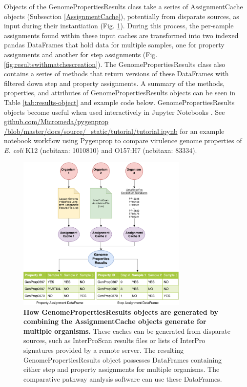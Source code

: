 Objects of the GenomePropertiesResults class take a series of AssignmentCache 
objects (Subsection \ref{AssignmentCache}), potentially from disparate sources, 
as input during their instantiation (Fig. \ref{fig:resultscreation}). During 
this process, the per-sample assignments found within these input caches are 
transformed into two indexed pandas DataFrames \cite{mckinney2010data} that hold 
data for multiple samples, one for property assignments and another for step 
assignments (Fig. \ref{fig:resultswithmatchescreation}). The 
GenomePropertiesResults class also contains a series of methods that return 
versions of these DataFrames with filtered down step and property assignments. A 
summary of the methods, properties, and attributes of GenomePropertiesResults 
objects can be seen in Table \ref{tab:results-object} and example code below. 
GenomePropertiesResults objects become useful when used interactively in Jupyter 
Notebooks \cite{kluyver2016jupyter}. See 
\href{http://github.com/Micromeda/pygenprop/blob/master/docs/source/_static/tutorial/tutorial.ipynb}{github.com/Micromeda/pygenprop 
/blob/master/docs/source/\_static/tutorial/tutorial.ipynb} for an example 
notebook workflow using Pygenprop to compare virulence genome properties of 
\textit{E. coli} K12 (\gls{ncbitaxa}: 1010810) and O157:H7 (\gls{ncbitaxa}: 
83334).

\begin{figure}[!ht]
  \centering
	\includegraphics[width=0.75\textwidth]{media/assignment_results_overview.pdf}
	 \caption[How GenomePropertiesResults objects are generated by combining the 
AssignmentCache objects generate for multiple 
organisms.]{\textbf{How GenomePropertiesResults objects are generated by combining the 
AssignmentCache objects generate for multiple organisms.} These caches can be 
generated from disparate sources, such as InterProScan results files or lists of 
InterPro signatures provided by a remote server. The resulting 
GenomePropertiesResults object possesses DataFrames containing either step and 
property assignments for multiple organisms. The comparative pathway analysis 
software can use these DataFrames.}
	 \label{fig:resultscreation}
\end{figure}

